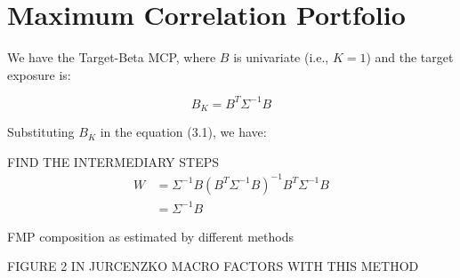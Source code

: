 \section{Maximum Correlation Portfolio}

We have the Target-Beta MCP, where 
$B$ is univariate (i.e., $K = 1$) and the
target exposure is:

\begin{equation}
    B_K = B^T \Sigma^{-1} B
\end{equation}

Substituting $B_K$ in the equation (3.1), we have:

FIND THE INTERMEDIARY STEPS
\begin{equation}
    \begin{aligned}
        W &= \Sigma^{-1} B (B^T \Sigma^{-1} B)^{-1} B^T \Sigma^{-1} B \\
        &= \Sigma^{-1} B
    \end{aligned}
\end{equation}


FMP composition as estimated by different methods

FIGURE 2 IN JURCENZKO MACRO FACTORS WITH THIS METHOD